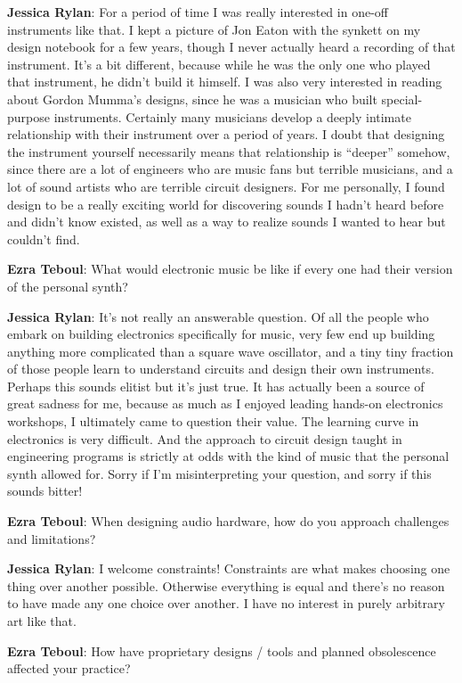 \textbf{Jessica Rylan}: For a period of time I was really interested in one-off instruments like that. I kept a picture of Jon Eaton with the synkett on my design notebook for a few years, though I never actually heard a recording of that instrument. It's a bit different, because while he was the only one who played that instrument, he didn't build it himself. I was also very interested in reading about Gordon Mumma's designs, since he was a musician who built special-purpose instruments. Certainly many musicians develop a deeply intimate relationship with their instrument over a period of years. I doubt that designing the instrument yourself necessarily means that relationship is ``deeper'' somehow, since there are a lot of engineers who are music fans but terrible musicians, and a lot of sound artists who are terrible circuit designers. For me personally, I found design to be a really exciting world for discovering sounds I hadn't heard before and didn't know existed, as well as a way to realize sounds I wanted to hear but couldn't find.

\textbf{Ezra Teboul}: What would electronic music be like if every one had their version of the personal synth? 
        
\textbf{Jessica Rylan}: It's not really an answerable question. Of all the people who embark on building electronics specifically for music, very few end up building anything more complicated than a square wave oscillator, and a tiny tiny fraction of those people learn to understand circuits and design their own instruments. Perhaps this sounds elitist but it's just true. It has actually been a source of great sadness for me, because as much as I enjoyed leading hands-on electronics workshops, I ultimately came to question their value. The learning curve in electronics is very difficult. And the approach to circuit design taught in engineering programs is strictly at odds with the kind of music that the personal synth allowed for. Sorry if I'm misinterpreting your question, and sorry if this sounds bitter!

\textbf{Ezra Teboul}: When designing audio hardware, how do you approach challenges and limitations?

\textbf{Jessica Rylan}: I welcome constraints! Constraints are what makes choosing one thing over another possible. Otherwise everything is equal and there's no reason to have made any one choice over another. I have no interest in purely arbitrary art like that.

\textbf{Ezra Teboul}: How have proprietary designs / tools and planned obsolescence affected your practice?
					

